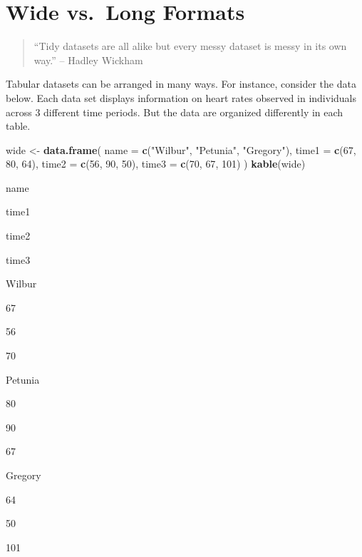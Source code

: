 \documentclass[]{book}
\newenvironment{Shaded}{\begin{snugshade}}{\end{snugshade}}
\newcommand{\KeywordTok}[1]{\textcolor[rgb]{0.13,0.29,0.53}{\textbf{#1}}}
\newcommand{\DataTypeTok}[1]{\textcolor[rgb]{0.13,0.29,0.53}{#1}}
\newcommand{\DecValTok}[1]{\textcolor[rgb]{0.00,0.00,0.81}{#1}}
\newcommand{\StringTok}[1]{\textcolor[rgb]{0.31,0.60,0.02}{#1}}
\newcommand{\NormalTok}[1]{#1}
\begin{document}
\section{Wide vs.~Long Formats}\label{wide-vs.long-formats}

\begin{quote}
``Tidy datasets are all alike but every messy dataset is messy in its
own way.'' -- Hadley Wickham
\end{quote}

Tabular datasets can be arranged in many ways. For instance, consider
the data below. Each data set displays information on heart rates
observed in individuals across 3 different time periods. But the data
are organized differently in each table.

\begin{Shaded}
\begin{Highlighting}[]
\NormalTok{wide <-}\StringTok{ }\KeywordTok{data.frame}\NormalTok{(}
  \DataTypeTok{name =} \KeywordTok{c}\NormalTok{(}\StringTok{"Wilbur"}\NormalTok{, }\StringTok{"Petunia"}\NormalTok{, }\StringTok{"Gregory"}\NormalTok{),}
  \DataTypeTok{time1 =} \KeywordTok{c}\NormalTok{(}\DecValTok{67}\NormalTok{, }\DecValTok{80}\NormalTok{, }\DecValTok{64}\NormalTok{),}
  \DataTypeTok{time2 =} \KeywordTok{c}\NormalTok{(}\DecValTok{56}\NormalTok{, }\DecValTok{90}\NormalTok{, }\DecValTok{50}\NormalTok{),}
  \DataTypeTok{time3 =} \KeywordTok{c}\NormalTok{(}\DecValTok{70}\NormalTok{, }\DecValTok{67}\NormalTok{, }\DecValTok{101}\NormalTok{)}
\NormalTok{)}
\KeywordTok{kable}\NormalTok{(wide)}
\end{Highlighting}
\end{Shaded}

name

time1

time2

time3

Wilbur

67

56

70

Petunia

80

90

67

Gregory

64

50

101
\end{document}
